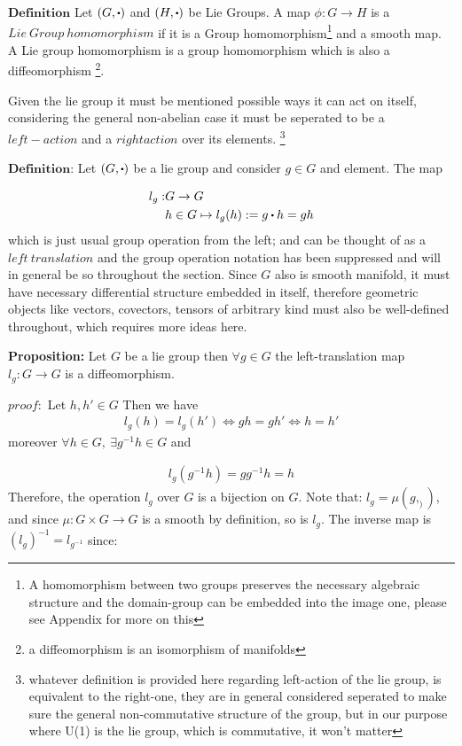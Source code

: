 \documentclass[8pt, twocoloumn]{article}
\begin{document}
$ \textbf{Definition}$ Let $(G, \sbullet)$ and $(H, \sbullet)$ be Lie Groups. A map $\phi : G \to H$ is a $Lie \ Group \ homomorphism$ if it is a Group homomorphism\footnote{A homomorphism between two groups preserves the necessary algebraic structure and the domain-group can be embedded into the image one, please see Appendix for more on this} and a smooth map. A Lie group homomorphism is a group homomorphism which is also a diffeomorphism \footnote{a diffeomorphism is an isomorphism of manifolds}.
 
 Given the lie group it must be mentioned possible ways it can act on itself, considering the general non-abelian case it must be seperated to be a $left-action$ and a $right action$ over its elements. \footnote{whatever definition is provided here regarding left-action of the lie group, is equivalent to the right-one, they are in general considered seperated to make sure the general non-commutative structure of the group, but in our purpose where U(1) is the lie group, which is commutative, it won't matter} 
 
 $\textbf{Definition}$: Let $(G, \sbullet)$ be a lie group and consider $g \in G$ and element. The map 
 
 \begin{align}
     l_g:&  G \to G \notag\\
     & h \in G \mapsto l_g(h) := g \sbullet h = gh  
 \end{align}
 which is just usual group operation from the left; and can be thought of as a $left \ translation$ and the group operation notation has been suppressed and will in general be so throughout the section. Since $G$ also is smooth manifold, it must have necessary differential structure embedded in itself, therefore geometric objects like vectors, covectors, tensors of arbitrary kind must also be well-defined throughout, which requires more ideas here. 
 
 \textbf{Proposition:} Let $G$ be a lie group then $\forall g \in G$ the left-translation map $l_g:  G \to G$ is a diffeomorphism.
 
$proof:$ Let $h, h' \in G$ Then we have 
\begin{align}
    l_g(h) = l_g(h') \Leftrightarrow gh = gh' \Leftrightarrow h = h'
\end{align}
moreover $\forall h \in G, \ \exists g^{-1}h \in G$ and 

\begin{align}
    l_g(g^{-1}h) = g g^{-1} h = h
\end{align}
 Therefore, the operation $l_g$ over $G$ is a bijection on $G$. Note that: $l_g = \mu(g, _ ))$, and since $\mu: G \times G \to G$ is a smooth by definition, so is $l_g$. The inverse map is ${(l_g)}^{-1}=l_{g^{-1}}$ since:
 
\end{document}

